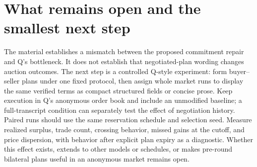 \documentclass{article}
\begin{document}
\section*{What remains open and the smallest next step}

The material establishes a mismatch between the proposed commitment repair and Q's bottleneck. It does not establish that negotiated-plan wording changes auction outcomes. The next step is a controlled Q-style experiment: form buyer--seller plans under one fixed protocol, then assign whole market runs to display the same verified terms as compact structured fields or concise prose. Keep execution in Q's anonymous order book and include an unmodified baseline; a full-transcript condition can separately test the effect of negotiation history. Paired runs should use the same reservation schedule and selection seed. Measure realized surplus, trade count, crossing behavior, missed gains at the cutoff, and price dispersion, with behavior after explicit plan expiry as a diagnostic. Whether this effect exists, extends to other models or schedules, or makes pre-round bilateral plans useful in an anonymous market remains open. 
\end{document}
